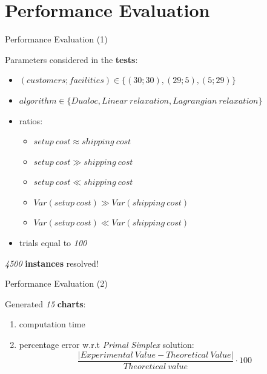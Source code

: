 \documentclass{beamer}
\begin{document}
	\section{Performance Evaluation}
	
	\begin{frame}{Performance Evaluation (1)}

	Parameters considered in the \textbf{tests}:
	
	\begin{itemize}
	    \item $(customers;facilities) \in \{(30; 30), (29; 5), (5;29)\}$
	    \item $algorithm \in \{Dualoc, Linear \ relaxation, Lagrangian \  relaxation\}$ 
	    \item ratios:
	    \begin{itemize}
	        \item[\ding{113}] $setup \ cost \approx shipping \ cost$
	        \item[\ding{113}] $setup \ cost \gg shipping \ cost$
	        \item[\ding{113}] $setup \ cost \ll shipping \ cost$
	        \item[\ding{113}] $Var(setup \ cost) \gg Var(shipping \ cost)$
            \item[\ding{113}] $Var(setup \ cost) \ll Var(shipping \ cost)$
	    \end{itemize}
	   \item trials equal to \textit{100} 
	\end{itemize}\pause
	
	\centering
	\textit{4500} \textbf{instances} resolved!
	
	\end{frame}
	
		\begin{frame}{Performance Evaluation (2)}

		Generated \textit{15} \textbf{charts}:
		\begin{enumerate}
		    \item computation time
		    \item percentage error w.r.t \textit{Primal Simplex} solution:
		    \begin{equation}
		    \frac{|Experimental \ Value-Theoretical \ Value|}{Theoretical \ value} \cdot 100
		    \end{equation}
		\end{enumerate}
		
        \end{frame}
	
\end{document}
